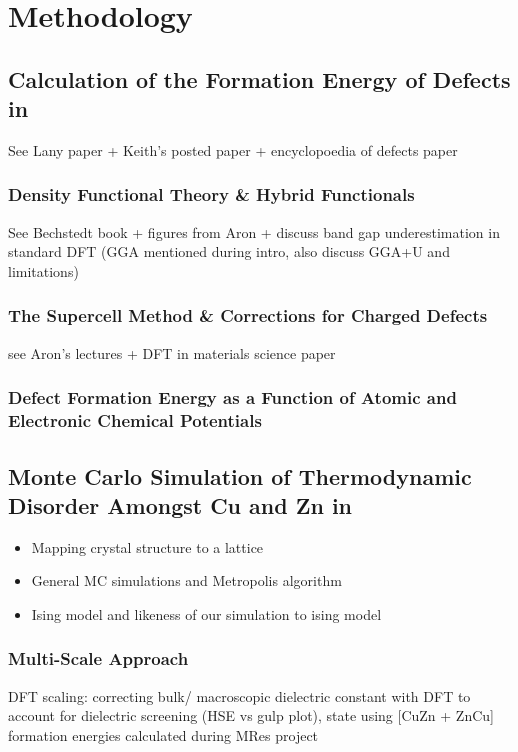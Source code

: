 \chapter{Methodology}

\section{Calculation of the Formation Energy of Defects in \CZTS}
See Lany paper + Keith's posted paper + encyclopoedia of defects paper 


\subsection{Density Functional Theory \& Hybrid Functionals}\label{DFT_section}
See Bechstedt book \cite{Bechstedt} + figures from Aron + discuss band gap underestimation in standard DFT (GGA mentioned during intro, also discuss GGA+U and limitations)


\subsection{The Supercell Method \& Corrections for Charged Defects}\label{supercell_section}
see Aron's lectures + DFT in materials science paper \cite{DFT_in_mat}

\subsection{Defect Formation Energy as a Function of Atomic and Electronic Chemical Potentials}


\section{Monte Carlo Simulation of Thermodynamic Disorder Amongst Cu and Zn in \CZTS}
\begin{itemize}
\item Mapping crystal structure to a lattice
\item General MC simulations and Metropolis algorithm
\item Ising model and likeness of our simulation to ising model
\end{itemize}

\subsection{Multi-Scale Approach}
DFT scaling: correcting bulk/ macroscopic dielectric constant with DFT to account for dielectric screening (HSE vs gulp plot), state using [CuZn + ZnCu] formation energies calculated during MRes project


